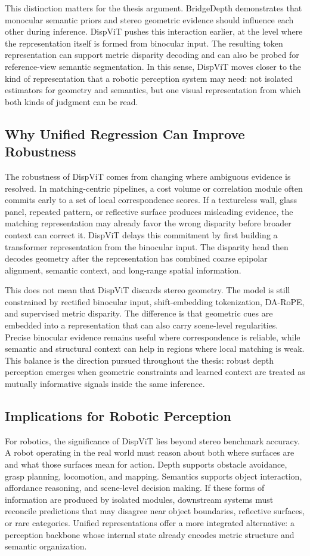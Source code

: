 This distinction matters for the thesis argument.
BridgeDepth demonstrates that monocular semantic priors and stereo geometric evidence should influence each other during inference.
DispViT pushes this interaction earlier, at the level where the representation itself is formed from binocular input.
The resulting token representation can support metric disparity decoding and can also be probed for reference-view semantic segmentation.
In this sense, DispViT moves closer to the kind of representation that a robotic perception system may need: not isolated estimators for geometry and semantics, but one visual representation from which both kinds of judgment can be read.

\subsection{Why Unified Regression Can Improve Robustness}
The robustness of DispViT comes from changing where ambiguous evidence is resolved.
In matching-centric pipelines, a cost volume or correlation module often commits early to a set of local correspondence scores.
If a textureless wall, glass panel, repeated pattern, or reflective surface produces misleading evidence, the matching representation may already favor the wrong disparity before broader context can correct it.
DispViT delays this commitment by first building a transformer representation from the binocular input.
The disparity head then decodes geometry after the representation has combined coarse epipolar alignment, semantic context, and long-range spatial information.

This does not mean that DispViT discards stereo geometry.
The model is still constrained by rectified binocular input, shift-embedding tokenization, DA-RoPE, and supervised metric disparity.
The difference is that geometric cues are embedded into a representation that can also carry scene-level regularities.
Precise binocular evidence remains useful where correspondence is reliable, while semantic and structural context can help in regions where local matching is weak.
This balance is the direction pursued throughout the thesis: robust depth perception emerges when geometric constraints and learned context are treated as mutually informative signals inside the same inference.

\subsection{Implications for Robotic Perception}
For robotics, the significance of DispViT lies beyond stereo benchmark accuracy.
A robot operating in the real world must reason about both where surfaces are and what those surfaces mean for action.
Depth supports obstacle avoidance, grasp planning, locomotion, and mapping.
Semantics supports object interaction, affordance reasoning, and scene-level decision making.
If these forms of information are produced by isolated modules, downstream systems must reconcile predictions that may disagree near object boundaries, reflective surfaces, or rare categories.
Unified representations offer a more integrated alternative: a perception backbone whose internal state already encodes metric structure and semantic organization.

